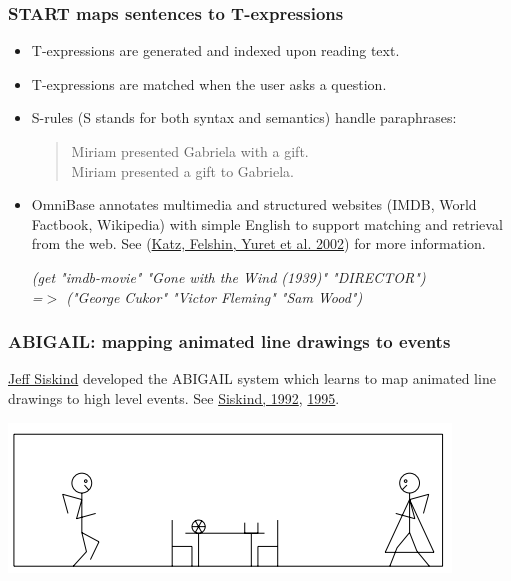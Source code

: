 \documentclass[ignorenonframetext]{beamer}
\begin{document}
\begin{frame}\frametitle{START maps sentences to T-expressions}
\begin{itemize}
\item T-expressions are generated and indexed upon reading text.
\item T-expressions are matched when the user asks a question.
\item S-rules (S stands for both syntax and semantics) handle paraphrases:
\begin{quote}
Miriam presented Gabriela with a gift.\\
Miriam presented a gift to Gabriela.
\end{quote}
\item OmniBase annotates multimedia and structured websites (IMDB,
  World Factbook, Wikipedia) with simple English to support matching
  and retrieval from the web.  See
  (\href{http://www.denizyuret.com/pub/nldb02/Katz-etal-NLDB02.pdf}{Katz,
    Felshin, Yuret et al. 2002}) for more information.
\vspace*{1em}

{\small\sl
(get "imdb-movie" "Gone with the Wind (1939)" "DIRECTOR") 
\\ =$>$ ("George Cukor" "Victor Fleming" "Sam Wood")
}
\end{itemize}
\end{frame}

\begin{frame}\frametitle{ABIGAIL: mapping animated line drawings to events}
\href{https://engineering.purdue.edu/~qobi/}{Jeff Siskind} developed the ABIGAIL system which learns to map
animated line drawings to high level events.
See \href{ftp://publications.ai.mit.edu/ai-publications/pdf/AITR-1456.pdf}{Siskind, 1992}, \href{http://www2.denizyuret.com/bib/siskind/siskind1994grounding/siskind1995grounding.pdf}{1995}.
\vspace{1em}
\begin{center}
\includegraphics[width=\textwidth]{images/siskind-abigail.png}
\end{center}
\end{frame}
\end{document}
